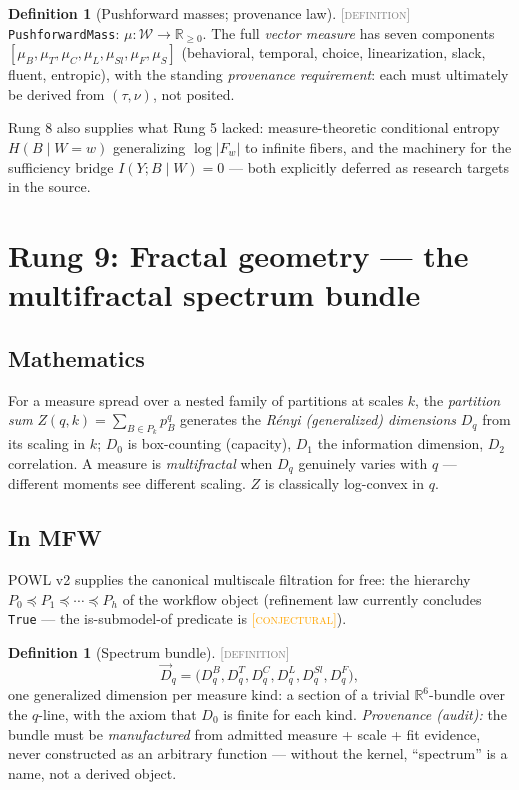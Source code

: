 \documentclass[11pt]{article}
\newcommand{\DEFINITION}{\textcolor{gray}{\textsc{[definition]}}}
\newcommand{\CONJECTURAL}{\textcolor{orange}{\textsc{[conjectural]}}}
\newcommand{\WS}{\mathcal{W}}
\newcommand{\fib}[1]{F_{#1}}
\newcommand{\R}{\mathbb{R}}
\theoremstyle{plain}
\theoremstyle{definition}
\newtheorem{definition}[theorem]{Definition}
\theoremstyle{remark}
\begin{document}
\begin{definition}[Pushforward masses; provenance law]\DEFINITION\;
\texttt{PushforwardMass}: $\mu : \WS \to \R_{\ge 0}$. The full
\emph{vector measure} has seven components
$[\mu_B, \mu_T, \mu_C, \mu_L, \mu_{Sl}, \mu_F, \mu_S]$ (behavioral,
temporal, choice, linearization, slack, fluent, entropic), with the
standing \emph{provenance requirement}: each must ultimately be derived
from $(\tau, \nu)$, not posited.
\end{definition}

Rung 8 also supplies what Rung 5 lacked: measure-theoretic conditional
entropy $H(B \mid W = w)$ generalizing $\log|\fib{w}|$ to infinite fibers,
and the machinery for the sufficiency bridge $I(Y; B \mid W) = 0$ --- both
explicitly deferred as research targets in the source.

\section{Rung 9: Fractal geometry --- the multifractal spectrum bundle}
\label{sec:rung9}

\subsection{Mathematics}
For a measure spread over a nested family of partitions at scales $k$, the
\emph{partition sum} $Z(q,k) = \sum_{B \in P_k} p_B^q$ generates the
\emph{R\'enyi (generalized) dimensions} $D_q$ from its scaling in $k$;
$D_0$ is box-counting (capacity), $D_1$ the information dimension, $D_2$
correlation. A measure is \emph{multifractal} when $D_q$ genuinely varies
with $q$ --- different moments see different scaling. $Z$ is classically
log-convex in $q$.

\subsection{In MFW}
POWL v2 supplies the canonical multiscale filtration for free: the
hierarchy $P_0 \preceq P_1 \preceq \cdots \preceq P_h$ of the workflow
object (refinement law currently concludes \texttt{True} --- the
is-submodel-of predicate is \CONJECTURAL).

\begin{definition}[Spectrum bundle]\DEFINITION\;
\[
  \vec{D}_q = \big(D_q^{B}, D_q^{T}, D_q^{C}, D_q^{L}, D_q^{Sl},
  D_q^{F}\big),
\]
one generalized dimension per measure kind: a section of a trivial
$\R^6$-bundle over the $q$-line, with the axiom that $D_0$ is finite for
each kind. \emph{Provenance (audit):} the bundle must be
\emph{manufactured} from admitted measure + scale + fit evidence, never
constructed as an arbitrary function --- without the kernel, ``spectrum''
is a name, not a derived object.
\end{definition}
\end{document}

